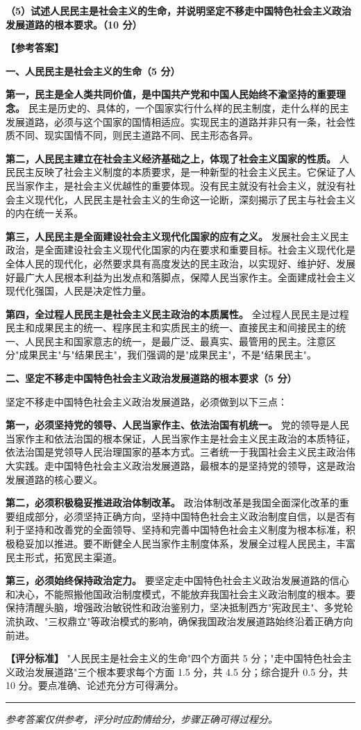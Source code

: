 \documentclass[12pt, a4paper]{article}
\newcommand{\examrule}{\noindent\rule{\linewidth}{0.6pt}}
\begin{document}
\begin{answerbox}
\textbf{（5）试述人民民主是社会主义的生命，并说明坚定不移走中国特色社会主义政治发展道路的根本要求。（10 分）}

\textbf{【参考答案】}

\textbf{一、人民民主是社会主义的生命（5 分）}

\textbf{第一，民主是全人类共同价值，是中国共产党和中国人民始终不渝坚持的重要理念。} 民主是历史的、具体的，一个国家实行什么样的民主制度，走什么样的民主发展道路，必须与这个国家的国情相适应。实现民主的道路并非只有一条，社会性质不同、现实国情不同，则民主道路不同、民主形态各异。

\textbf{第二，人民民主建立在社会主义经济基础之上，体现了社会主义国家的性质。} 人民民主反映了社会主义制度的本质要求，是一种新型的社会主义民主。它保证了人民当家作主，是社会主义优越性的重要体现。没有民主就没有社会主义，就没有社会主义现代化，人民民主是社会主义的生命这一论断，深刻揭示了民主与社会主义的内在统一关系。

\textbf{第三，人民民主是全面建设社会主义现代化国家的应有之义。} 发展社会主义民主政治，是全面建设社会主义现代化国家的内在要求和重要目标。社会主义现代化是全体人民的现代化，必然要求具有高度发达的民主政治，以实现好、维护好、发展好最广大人民根本利益为出发点和落脚点，保障人民当家作主。全面建成社会主义现代化强国，人民是决定性力量。

\textbf{第四，全过程人民民主是社会主义民主政治的本质属性。} 全过程人民民主是过程民主和成果民主的统一、程序民主和实质民主的统一、直接民主和间接民主的统一、人民民主和国家意志的统一，是最广泛、最真实、最管用的民主。注意区分"成果民主"与"结果民主"，我们强调的是"成果民主"，不是"结果民主"。

\textbf{二、坚定不移走中国特色社会主义政治发展道路的根本要求（5 分）}

坚定不移走中国特色社会主义政治发展道路，必须做到以下三点：

\textbf{第一，必须坚持党的领导、人民当家作主、依法治国有机统一。} 党的领导是人民当家作主和依法治国的根本保证，人民当家作主是社会主义民主政治的本质特征，依法治国是党领导人民治理国家的基本方式。三者统一于我国社会主义民主政治伟大实践。走中国特色社会主义政治发展道路，最根本的是坚持党的领导，这是政治发展道路的核心要义。

\textbf{第二，必须积极稳妥推进政治体制改革。} 政治体制改革是我国全面深化改革的重要组成部分，必须坚持正确方向，坚持中国特色社会主义政治制度自信，以是否有利于坚持和改善党的全面领导、坚持和完善中国特色社会主义制度为根本标准，积极稳妥加以推进。要不断健全人民当家作主制度体系，发展全过程人民民主，丰富民主形式，拓宽民主渠道。

\textbf{第三，必须始终保持政治定力。} 要坚定走中国特色社会主义政治发展道路的信心和决心，不能照搬他国政治制度模式，不能放弃我国社会主义政治制度的根本。要保持清醒头脑，增强政治敏锐性和政治鉴别力，坚决抵制西方"宪政民主"、多党轮流执政、"三权鼎立"等政治模式的影响，确保我国政治发展道路始终沿着正确方向前进。

\textbf{【评分标准】} "人民民主是社会主义的生命"四个方面共 5 分；"走中国特色社会主义政治发展道路"三个根本要求每个方面 1.5 分，共 4.5 分；综合提升 0.5 分，共 10 分。要点准确、论述充分方可得满分。
\end{answerbox}

\vspace{12pt}
\examrule
\begin{center}
  \textit{参考答案仅供参考，评分时应酌情给分，步骤正确可得过程分。}
\end{center}
\end{document}
